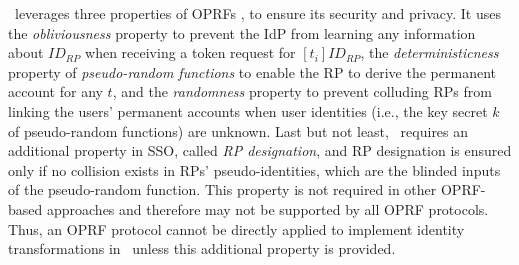 \usso~leverages three properties of OPRFs \cite{oprf-proved,voprf-proved}, %
 to ensure its security and privacy. %
It uses the \emph{obliviousness} property to prevent the IdP from learning any information about $ID_{RP}$ when receiving a token request for $[t_i]ID_{RP}$, the \emph{deterministicness} property of \emph{pseudo-random functions} to enable the RP to derive the permanent account for any $t$,
and the \emph{randomness} property to prevent colluding RPs from linking the users' permanent accounts when user identities (i.e., the key secret $k$ of pseudo-random functions) are unknown.
Last but not least, \usso~requires an additional property in SSO, called \emph{RP designation}, 
 and RP designation is ensured only if no collision exists in RPs' pseudo-identities, which are the blinded inputs of the pseudo-random function.
This property is not required in other OPRF-based approaches and therefore may not be supported by all OPRF protocols.
Thus, an OPRF protocol cannot be directly applied to implement identity transformations in \usso\ unless this additional property is provided.




